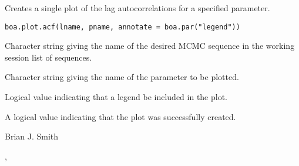 \begin{Description}\relax
Creates a single plot of the lag autocorrelations for a specified parameter.
\end{Description}
\begin{Usage}
\begin{verbatim}
boa.plot.acf(lname, pname, annotate = boa.par("legend"))
\end{verbatim}
\end{Usage}
\begin{Arguments}
\begin{ldescription}
\item[\code{lname}] Character string giving the name of the desired MCMC sequence in 
the working session list of sequences.
\item[\code{pname}] Character string giving the name of the parameter to be plotted.
\item[\code{annotate}] Logical value indicating that a legend be included in the plot.
\end{ldescription}
\end{Arguments}
\begin{Value}
A logical value indicating that the plot was successfully created.
\end{Value}
\begin{Author}\relax
Brian J. Smith
\end{Author}
\begin{SeeAlso}\relax
{}, 
\end{SeeAlso}


